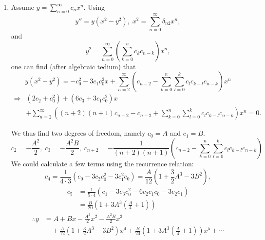 \item
\begin{enumerate}[wide, labelindent=0pt, label= (\alph*)]
	\item
	      Assume $y = \sum_{n=0}^\infty c_n x^n$.
	      Using
	      \[
		      y'' = y \left( x^2 - y^2 \right),\; x^2 = \sum_{n=0}^\infty \delta_{n2} x^n,
	      \]
	      and
	      \[
		      y^2 = \sum_{n=0}^\infty \left( \sum_{k=0}^n c_k c_{n - k} \right) x^n,
	      \]
	      one can find (after algebraic tedium) that
	      \[
		      y \left( x^2 - y^2 \right)
		      = -c_0^2 - 3c_1 c_0^2 x + \sum_{n=2}^\infty \left(
		      c_{n - 2} - \sum_{k=0}^n \sum_{l=0}^k c_l c_{k - l} c_{n - k}
		      \right) x^n
	      \]
	      \begin{align*}
		      \Rightarrow
		       & \left( 2c_2 + c_0^2 \right)
		      + \left( 6c_3 + 3c_1 c_0^2 \right) x \\
		       & + \sum_{n=2}^\infty \left(
		      (n + 2)(n + 1) c_{n + 2} - c_{n - 2}
		      + \sum_{k=0}^n \sum_{l=0}^k c_l c_{k - l} c_{n - k}
		      \right) x^n = 0.
	      \end{align*}

	      We thus find two degrees of freedom, namely $c_0 = A$ and $c_1 = B$.
	      \[
		      c_2 = -\frac{A^2}{2},\;
		      c_3 = -\frac{A^2 B}{2},\;
		      c_{n + 2} = -\frac{1}{(n + 2)(n + 1)} \left(
		      c_{n - 2} - \sum_{k=0}^n \sum_{l = 0}^k c_l c_{k - l} c_{n - k}
		      \right)
	      \]
	      We could calculate a few terms using the recurrence relation:
	      \[
		      c_4
		      = \frac{1}{4 \cdot 3} \left(
		      c_0 - 3c_2 c_0^2 - 3c_1^2 c_0
		      \right)
		      = \frac{A}{12} \left(
		      1 + \frac{3}{2}A^3 - 3B^2
		      \right),
	      \]
	      \begin{align*}
		      c_5
		       & = \frac{1}{5 \cdot 4} \left(
		      c_1 - 3c_3 c_0^2 - 6c_2 c_1 c_0 - 3c_2 c_1
		      \right)                         \\
		       & = \frac{B}{20} \left(
		      1 + 3A^3 \left( \frac{A}{4} + 1 \right)
		      \right)
	      \end{align*}
	      \begin{align*}
		      \therefore
		      y
		      &= A + Bx - \frac{A^2}{2}x^2 - \frac{A^2 B}{2}x^3 \\
		        &\quad + \frac{A}{12} \left(
		          1 + \frac{3}{2}A^3 - 3B^2
		      \right) x^4
		      + \frac{B}{20} \left(
		      1 + 3A^3 \left( \frac{A}{4} + 1 \right)
		      \right) x^5
		      + \cdots
	      \end{align*}


\end{enumerate}

